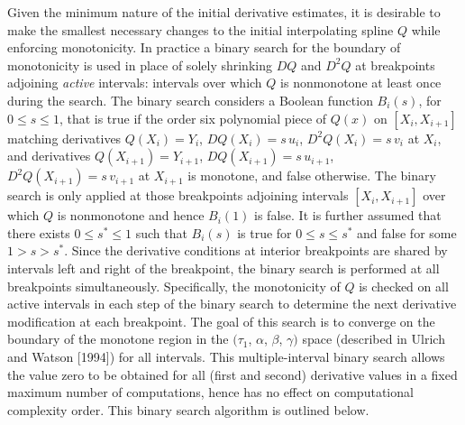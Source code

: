 Given the minimum 
nature of the initial derivative estimates, it is desirable to make
the smallest necessary changes to the initial interpolating spline $Q$
while enforcing monotonicity. In practice a binary search for the
boundary of monotonicity is used in place of solely shrinking $DQ$ and
$D^2Q$ at breakpoints adjoining {\it active\/} intervals: intervals
over which $Q$ is nonmonotone at least once during the search. The
binary search considers a Boolean function $B_i(s)$, for $0 \le s \le
1$, that is true if the order six polynomial piece of $Q(x)$ on
$[X_i, X_{i+1}]$ matching derivatives
$Q(X_i)=Y_i$, $DQ(X_i)=s \,u_i$, $D^2Q(X_i)=s \,v_i$ at $X_i$, and 
derivatives $Q(X_{i+1})=Y_{i+1}$, $DQ(X_{i+1})=s \,u_{i+1}$, 
$D^2Q(X_{i+1})=s \,v_{i+1}$ at $X_{i+1}$ is monotone, and false
otherwise.  The binary search is only applied at those breakpoints
adjoining intervals $[X_i, X_{i+1}]$ over which $Q$ is nonmonotone and
hence $B_i(1)$ is false.  It is further assumed that there exists
$0 \le s^* \le 1$ such that $B_i(s)$ is true for $0 \le s \le s^*$ and
false for some $1 > s > s^*$. Since the derivative conditions at
interior breakpoints are shared by intervals left and right of the
breakpoint, the binary search is performed at all breakpoints
simultaneously.  Specifically, the monotonicity of $Q$ is checked on
all active intervals in each step of the binary search to determine
the next derivative modification at each breakpoint. The goal of this
search is to converge on the boundary of the monotone region in the
$(\tau_1$, $\alpha$, $\beta$, $\gamma)$ space (described in Ulrich and
Watson [1994]) for all intervals. This multiple-interval binary search
allows the value zero to be obtained for all (first and second)
derivative values in a fixed maximum number of computations, hence has
no effect on computational complexity order. This binary search
algorithm is outlined below.


